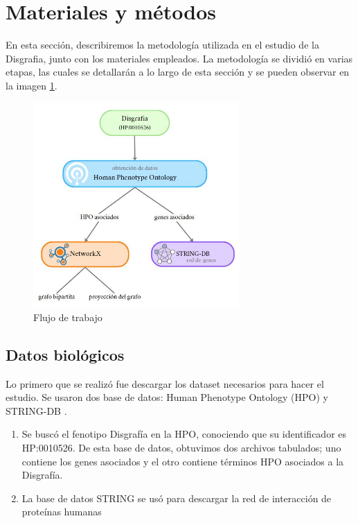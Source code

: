 \section{Materiales y métodos}

En esta sección, describiremos la metodología utilizada en el estudio de la Disgrafia,
junto con los materiales empleados. La metodología se dividió en varias etapas, las
cuales se detallarán a lo largo de esta sección y se pueden observar en la imagen \ref{fig:workflow}.

\begin{figure}[h!]
	\centering
	\includegraphics[width=0.7\textwidth]{figures/workflow.JPG}
	\caption{Flujo de trabajo}
	\label{fig:workflow}
\end{figure}

\subsection{Datos biológicos}

Lo primero que se realizó fue descargar los dataset necesarios para hacer el estudio. Se usaron dos base de datos: Human Phenotype Ontology (HPO) \cite{HPO2021} y STRING-DB \cite{String2021}.

\begin{enumerate}
	\item Se buscó el fenotipo Disgrafía en la HPO, conociendo que su identificador es HP:0010526. De esta base de datos, obtuvimos dos archivos tabulados; uno contiene los genes asociados y el otro contiene términos HPO asociados a la Disgrafía.
	\item La base de datos STRING se usó para descargar la red de interacción de proteínas humanas
\end{enumerate}


